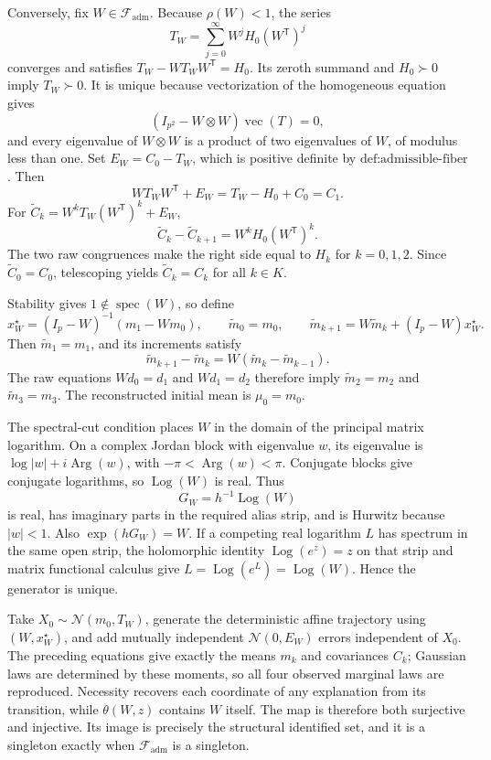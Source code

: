 Conversely, fix \(W\in\mathcal F_{\mathrm{adm}}\).  Because \(\rho(W)<1\), the series
\[
 T_W=\sum_{j=0}^{\infty}W^jH_0(W^{\mathsf T})^j
\]
converges and satisfies \(T_W-WT_WW^{\mathsf T}=H_0\).  Its zeroth summand and \(H_0\succ0\) imply \(T_W\succ0\).  It is unique because vectorization of the homogeneous equation gives
\[
 (I_{p^2}-W\otimes W)\operatorname{vec}(T)=0,
\]
and every eigenvalue of \(W\otimes W\) is a product of two eigenvalues of \(W\), of modulus less than one.  Set \(E_W=C_0-T_W\), which is positive definite by \(\text{def:admissible-fiber}\).  Then
\[
 WT_WW^{\mathsf T}+E_W=T_W-H_0+C_0=C_1.
\]
For \(\widetilde C_k=W^kT_W(W^{\mathsf T})^k+E_W\),
\[
 \widetilde C_k-\widetilde C_{k+1}=W^kH_0(W^{\mathsf T})^k.
\]
The two raw congruences make the right side equal to \(H_k\) for \(k=0,1,2\).  Since \(\widetilde C_0=C_0\), telescoping yields \(\widetilde C_k=C_k\) for all \(k\in K\).

Stability gives \(1\notin\operatorname{spec}(W)\), so define
\[
 x_W^\star=(I_p-W)^{-1}(m_1-Wm_0),
 \qquad \widetilde m_0=m_0,
 \qquad \widetilde m_{k+1}=W\widetilde m_k+(I_p-W)x_W^\star.
\]
Then \(\widetilde m_1=m_1\), and its increments satisfy
\[
 \widetilde m_{k+1}-\widetilde m_k
 =W(\widetilde m_k-\widetilde m_{k-1}).
\]
The raw equations \(Wd_0=d_1\) and \(Wd_1=d_2\) therefore imply \(\widetilde m_2=m_2\) and \(\widetilde m_3=m_3\).  The reconstructed initial mean is \(\mu_0=m_0\).

The spectral-cut condition places \(W\) in the domain of the principal matrix logarithm.  On a complex Jordan block with eigenvalue \(w\), its eigenvalue is \(\log|w|+i\operatorname{Arg}(w)\), with \(-\pi<\operatorname{Arg}(w)<\pi\).  Conjugate blocks give conjugate logarithms, so \(\operatorname{Log}(W)\) is real.  Thus
\[
 G_W=h^{-1}\operatorname{Log}(W)
\]
is real, has imaginary parts in the required alias strip, and is Hurwitz because \(|w|<1\).  Also \(\exp(hG_W)=W\).  If a competing real logarithm \(L\) has spectrum in the same open strip, the holomorphic identity \(\operatorname{Log}(e^z)=z\) on that strip and matrix functional calculus give \(L=\operatorname{Log}(e^L)=\operatorname{Log}(W)\).  Hence the generator is unique.

Take \(X_0\sim\mathcal N(m_0,T_W)\), generate the deterministic affine trajectory using \((W,x_W^\star)\), and add mutually independent \(\mathcal N(0,E_W)\) errors independent of \(X_0\).  The preceding equations give exactly the means \(m_k\) and covariances \(C_k\); Gaussian laws are determined by these moments, so all four observed marginal laws are reproduced.  Necessity recovers each coordinate of any explanation from its transition, while \(\theta(W,z)\) contains \(W\) itself.  The map is therefore both surjective and injective.  Its image is precisely the structural identified set, and it is a singleton exactly when \(\mathcal F_{\mathrm{adm}}\) is a singleton.

